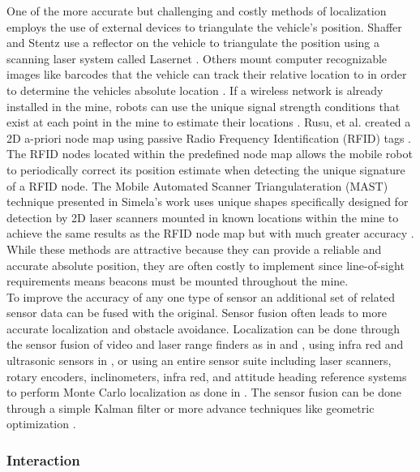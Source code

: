 One of the more accurate but challenging and costly methods of localization employs the use of external devices to triangulate the vehicle's position. Shaffer and Stentz use a reflector on the vehicle to triangulate the position using a scanning laser system called Lasernet \cite{both}. Others mount computer recognizable images like barcodes that the vehicle can track their relative location to in order to determine the vehicles absolute location \cite{barcode}. If a wireless network is already installed in the mine, robots can use the unique signal strength conditions that exist at each point in the mine to estimate their locations \cite{signal}. Rusu, et al. created a 2D a-priori node map using passive Radio Frequency Identification (RFID) tags \cite{rfirusu}. The RFID nodes located within the predefined node map allows the mobile robot to periodically correct its position estimate when detecting the unique signature of a RFID node. The Mobile Automated Scanner Triangulateration (MAST) technique presented in Simela's work uses unique shapes specifically designed for detection by 2D laser scanners mounted in known locations within the mine to achieve the same results as the RFID node map but with much greater accuracy \cite{simela}. While these methods are attractive because they can provide a reliable and accurate absolute position, they are often costly to implement since line-of-sight requirements means beacons must be mounted throughout the mine.\\

To improve the accuracy of any one type of sensor an additional set of related sensor data can be fused with the original. Sensor fusion often leads to more accurate localization and obstacle avoidance. Localization can be done through the sensor fusion of video and laser range finders as in \cite{vis1} and \cite{vis2}, using infra red and ultrasonic sensors in \cite{irsonic}, or using an entire sensor suite including laser scanners, rotary encoders, inclinometers, infra red, and attitude heading reference systems to perform Monte Carlo localization as done in \cite{carlo}. The sensor fusion can be done through a simple Kalman filter or more advance techniques like geometric optimization \cite{geom}.\\

\subsubsection{Interaction}
\label{sec:interact}

